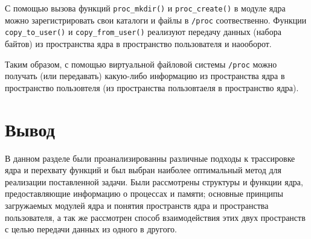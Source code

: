 С помощью вызова функций \texttt{proc\_mkdir()} и \texttt{proc\_create()} в модуле ядра можно зарегистрировать свои каталоги и файлы в \texttt{/proc} соотвественно. Функции \texttt{copy\_to\_user()} и \texttt{copy\_from\_user()} реализуют передачу данных (набора байтов) из пространства ядра в пространство пользователя и наооборот.

Таким образом, с помощью виртуальной файловой системы \texttt{/proc} можно получать (или передавать) какую-либо информацию из пространства ядра в пространство пользовтеля (из пространства пользовтаеля в пространство ядра).

\section*{Вывод}

В данном разделе были проанализированны различные подходы к трассировке ядра и перехвату функций и был выбран наиболее оптимальный метод для реализации поставленной задачи. Были рассмотрены структуры и функции ядра, предоставляющие информацию о процессах и памяти; основные принципы загружаемых модулей ядра и понятия пространств ядра и пространства пользователя, а так же рассмотрен способ взаимодействия этих двух пространств с целью передачи данных из одного в другого.



